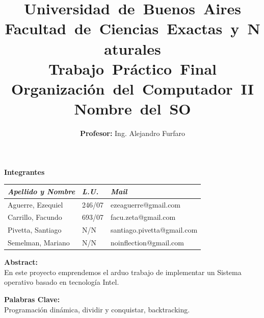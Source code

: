 \documentclass[a4paper,10pt]{article}
\begin{document}
 
\title{
	\mbox{\Huge Universidad de Buenos Aires}\\
	\mbox{\huge Facultad de Ciencias Exactas y Naturales}\\
	\vspace{20mm}
	\mbox{\textbf{Trabajo Pr\'actico Final}}\\
	\mbox{\textbf{Organización del Computador II}}\\
	\mbox{\textbf{Nombre del SO}}\\
	\vspace{8mm}
}
\author{\Large\textbf{Profesor:} Ing. Alejandro Furfaro}
\date{}
\maketitle \thispagestyle{empty}

\begin{center}
    \vspace{15mm}
    \textbf{Integrantes}\\

    \begin{tabular}{|l|l|l|}
        \hline
        \textit{Apellido y Nombre} & \textit{L.U.} & \textit{Mail} \\
        \hline
		Aguerre, Ezequiel & 246/07 & ezeaguerre@gmail.com \\
        \hline
		Carrillo, Facundo & 693/07 & facu.zeta@gmail.com \\
	    \hline
		Pivetta, Santiago & N/N & santiago.pivetta@gmail.com \\
        \hline
		Semelman, Mariano & N/N & noinflection@gmail.com \\
        \hline
    \end{tabular}
\end{center}


\begin{center}
    \vspace{10mm}
    \textbf{Abstract:}\\    
   En este proyecto emprendemos el arduo trabajo de implementar un Sistema operativo basado en tecnología Intel.
    \vspace{5mm}
\end{center}

\begin{center}
    \vspace{5mm}
    \textbf{Palabras Clave:}\\
		Programación dinámica, dividir y conquistar, backtracking.
    \vspace{5mm}
\end{center}
\end{document}
